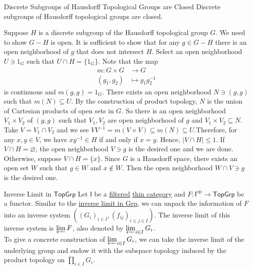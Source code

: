 \documentclass{report}
\begin{document}
\begin{proposition}{Discrete Subgroups of Hausdorff Topological Groups are Closed}{}
	Discrete subgroups of Hausdorff topological groups are closed.
\end{proposition}
\begin{prf}
	Suppose $H$ is a discrete subgroup of the Hausdorff topological group $G$. We need to show $G-H$ is open. It is sufficient to show that for any $g \in G-H$ there is an open neighborhood of $g$ that does not intersect $H$. Select an open neighborhood $U \ni 1_G$ such that $U \cap H=\{1_G\}$. Note that the map
	\begin{align*}
		m:G\times G & \longrightarrow G       \\
		(g_1,g_2)   & \longmapsto g_1g_2^{-1}
	\end{align*}
	is continuous and $m(g,g)=1_G$. There exists an open neighborhood $N \ni (g,g)$ such that $m(N) \subseteq U$. By the construction of product topology, $N$ is the union of Cartesian products of open sets in $G$. So there is an open neighborhood $V_1\times V_2$ of $(g,g)$ such that $V_1,V_2$ are open neighborhood of $g$ and $V_1\times V_2\subseteq N$. Take $V=V_1\cap V_2$ and we see $VV^{-1}=m(V\times V)\subseteq m(N)\subseteq U$.Therefore, for any $x, y \in V$, we have $x y^{-1} \in H$ if and only if $x=y$. Hence, $|V \cap H| \leq 1$. If $V \cap H=\varnothing$, the open neighborhood $V\ni g$ is the desired one and we are done. Otherwise, suppose $V \cap H=\{x\}$. Since $G$ is a Hausdorff space, there exists an open set $W$ such that $g \in W$ and $x \notin W$. Then the open neighborhood $W \cap V \ni g$ is the desired one.
\end{prf}


\begin{definition}{Inverse Limit in $\mathsf{TopGrp}$}{}
	Let $\mathsf{I}$ be a \hyperref[th:filtered_category]{filtered} \hyperref[th:thin_category]{thin category} and $F:\mathsf{I}^{\mathrm{op}}\to \mathsf{TopGrp}$ be a functor. Similar to the \hyperref[th:inverse_limit_of_groups]{inverse limit in \textsf{Grp}}, we can unpack the information of $F$ into an inverse system $\left(\left(G_i\right)_{i \in I},\left(f_{i j}\right)_{i \leq j \in I}\right)$. The inverse limit of this inverse system is $\varprojlim F$, also denoted by $\varprojlim_{i\in I}G_i$.\\
	To give a concrete construction of $\varprojlim_{i\in I}G_i$, we can take the inverse limit of the underlying group and endow it with the subspace topology induced by the product topology on $\prod_{i\in I}G_i$.
\end{definition}
\end{document}
